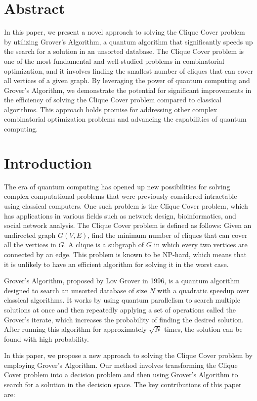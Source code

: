 \section{Abstract}

In this paper, we present a novel approach to solving the Clique Cover problem by utilizing Grover's Algorithm, a quantum algorithm that significantly speeds up the search for a solution in an unsorted database. The Clique Cover problem is one of the most fundamental and well-studied problems in combinatorial optimization, and it involves finding the smallest number of cliques that can cover all vertices of a given graph. By leveraging the power of quantum computing and Grover's Algorithm, we demonstrate the potential for significant improvements in the efficiency of solving the Clique Cover problem compared to classical algorithms. This approach holds promise for addressing other complex combinatorial optimization problems and advancing the capabilities of quantum computing.

\section{Introduction}

The era of quantum computing has opened up new possibilities for solving complex computational problems that were previously considered intractable using classical computers. One such problem is the Clique Cover problem, which has applications in various fields such as network design, bioinformatics, and social network analysis. The Clique Cover problem is defined as follows: Given an undirected graph $G(V, E)$, find the minimum number of cliques that can cover all the vertices in $G$. A clique is a subgraph of $G$ in which every two vertices are connected by an edge. This problem is known to be NP-hard, which means that it is unlikely to have an efficient algorithm for solving it in the worst case.

Grover's Algorithm, proposed by Lov Grover in 1996, is a quantum algorithm designed to search an unsorted database of size $N$ with a quadratic speedup over classical algorithms. It works by using quantum parallelism to search multiple solutions at once and then repeatedly applying a set of operations called the Grover's iterate, which increases the probability of finding the desired solution. After running this algorithm for approximately $\sqrt{N}$ times, the solution can be found with high probability.

In this paper, we propose a new approach to solving the Clique Cover problem by employing Grover's Algorithm. Our method involves transforming the Clique Cover problem into a decision problem and then using Grover's Algorithm to search for a solution in the decision space. The key contributions of this paper are:


